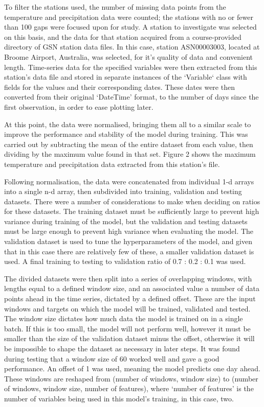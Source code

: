 \documentclass[12pt]{article}
\begin{document}
    To filter the stations used, the number of missing data points from the temperature and precipitation data were counted; the stations with no or fewer than 100 gaps were focused upon for study. A station to investigate was selected on this basis, and the data for that station acquired from a course-provided directory of GSN station data files. In this case, station ASN00003003, located at Broome Airport, Australia, was selected, for it's quality of data and convenient length. Time-series data for the specified variables were then extracted from this station's data file and stored in separate instances of the `Variable` class with fields for the values and their corresponding dates. These dates were then converted from their original ‘DateTime’ format, to the number of days since the first observation, in order to ease plotting later.
    
    At this point, the data were normalised, bringing them all to a similar scale to improve the performance and stability of the model during training. This was carried out by subtracting the mean of the entire dataset from each value, then dividing by the maximum value found in that set. Figure 2 shows the maximum temperature and precipitation data extracted from this station's file.
    
    Following normalisation, the data were concatenated from individual 1-d arrays into a single n-d array, then subdivided into training, validation and testing datasets. There were a number of considerations to make when deciding on ratios for these datasets. The training dataset must be sufficiently large to prevent high variance during training of the model, but the validation and testing datasets must be large enough to prevent high variance when evaluating the model. The validation dataset is used to tune the hyperparameters of the model, and given that in this case there are relatively few of these, a smaller validation dataset is used. A final training to testing to validation ratio of 0.7 : 0.2 : 0.1 was used.
    
    The divided datasets were then split into a series of overlapping windows, with lengths equal to a defined window size, and an associated value a number of data points ahead in the time series, dictated by a defined offset. These are the input windows and targets on which the model will be trained, validated and tested. The window size dictates how much data the model is trained on in a single batch. If this is too small, the model will not perform well, however it must be smaller than the size of the validation dataset minus the offset, otherwise it will be impossible to shape the dataset as necessary in later steps. It was found during testing that a window size of 60 worked well and gave a good performance. An offset of 1 was used, meaning the model predicts one day ahead. These windows are reshaped from (number of windows, window size) to (number of windows, window size, number of features), where ‘number of features’ is the number of variables being used in this model’s training, in this case, two.
    
\end{document}

